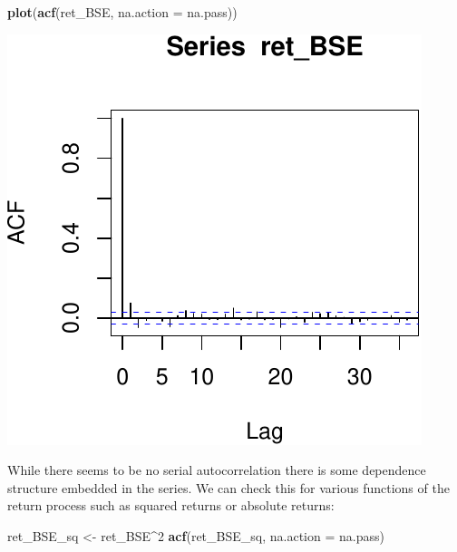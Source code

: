 \documentclass[11pt,]{article}
\newenvironment{Shaded}{\begin{snugshade}}{\end{snugshade}}
\newcommand{\KeywordTok}[1]{\textcolor[rgb]{0.13,0.29,0.53}{\textbf{#1}}}
\newcommand{\DataTypeTok}[1]{\textcolor[rgb]{0.13,0.29,0.53}{#1}}
\newcommand{\DecValTok}[1]{\textcolor[rgb]{0.00,0.00,0.81}{#1}}
\newcommand{\StringTok}[1]{\textcolor[rgb]{0.31,0.60,0.02}{#1}}
\newcommand{\OperatorTok}[1]{\textcolor[rgb]{0.81,0.36,0.00}{\textbf{#1}}}
\newcommand{\NormalTok}[1]{#1}
\begin{document}
\begin{Shaded}
\begin{Highlighting}[]
\KeywordTok{plot}\NormalTok{(}\KeywordTok{acf}\NormalTok{(ret_BSE, }\DataTypeTok{na.action =}\NormalTok{ na.pass))}
\end{Highlighting}
\end{Shaded}

\begin{center}\includegraphics{FMC_T4_PhD_ARMA_GARCH_files/figure-latex/BSE_ret_ACF-2} \end{center}

While there seems to be no serial autocorrelation there is some
dependence structure embedded in the series. We can check this for
various functions of the return process such as squared returns or
absolute returns:

\begin{Shaded}
\begin{Highlighting}[]
\NormalTok{ret_BSE_sq <-}\StringTok{ }\NormalTok{ret_BSE}\OperatorTok{^}\DecValTok{2}
\KeywordTok{acf}\NormalTok{(ret_BSE_sq, }\DataTypeTok{na.action =}\NormalTok{ na.pass)}
\end{Highlighting}
\end{Shaded}
\end{document}
